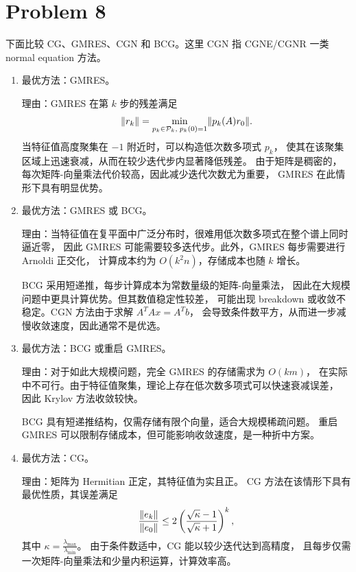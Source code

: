 \documentclass{ctexart}
\DeclarePairedDelimiter{\norm}{\lVert}{\rVert}
\begin{document}
\section*{Problem 8}
\begin{solution}

  下面比较 CG、GMRES、CGN 和 BCG。这里 CGN 指 CGNE/CGNR 一类 normal equation 方法。

  \begin{enumerate}

    \item

      最优方法：GMRES。

      理由：GMRES 在第 $k$ 步的残差满足
      \[
        \norm*{r_k} = \min_{p_k \in \mathcal{P}_k,\; p_k(0)=1} \norm*{p_k(A)r_0}.
      \]
      当特征值高度聚集在 $-1$ 附近时，可以构造低次数多项式 $p_k$，
      使其在该聚集区域上迅速衰减，从而在较少迭代步内显著降低残差。
      由于矩阵是稠密的，每次矩阵-向量乘法代价较高，因此减少迭代次数尤为重要，
      GMRES 在此情形下具有明显优势。

    \item

      最优方法：GMRES 或 BCG。

      理由：当特征值在复平面中广泛分布时，很难用低次数多项式在整个谱上同时逼近零，
      因此 GMRES 可能需要较多迭代步。此外，GMRES 每步需要进行 Arnoldi 正交化，
      计算成本约为 $O(k^2 n)$，存储成本也随 $k$ 增长。

      BCG 采用短递推，每步计算成本为常数量级的矩阵-向量乘法，
      因此在大规模问题中更具计算优势。但其数值稳定性较差，
      可能出现 breakdown 或收敛不稳定。CGN 方法由于求解 $A^TAx=A^Tb$，
      会导致条件数平方，从而进一步减慢收敛速度，因此通常不是优选。

    \item

      最优方法：BCG 或重启 GMRES。

      理由：对于如此大规模问题，完全 GMRES 的存储需求为 $O(km)$，
      在实际中不可行。由于特征值聚集，理论上存在低次数多项式可以快速衰减误差，
      因此 Krylov 方法收敛较快。

      BCG 具有短递推结构，仅需存储有限个向量，适合大规模稀疏问题。
      重启 GMRES 可以限制存储成本，但可能影响收敛速度，是一种折中方案。

    \item

      最优方法：CG。

      理由：矩阵为 Hermitian 正定，其特征值为实且正。
      CG 方法在该情形下具有最优性质，其误差满足
      \[
        \frac{\norm*{e_k}}{\norm*{e_0}} \le
        2\left(\frac{\sqrt{\kappa}-1}{\sqrt{\kappa}+1}\right)^k,
      \]
      其中 $\kappa = \frac{\lambda_{\max}}{\lambda_{\min}}$。
      由于条件数适中，CG 能以较少迭代达到高精度，
      且每步仅需一次矩阵-向量乘法和少量内积运算，计算效率高。


\end{enumerate}
\end{solution}
\end{document}
